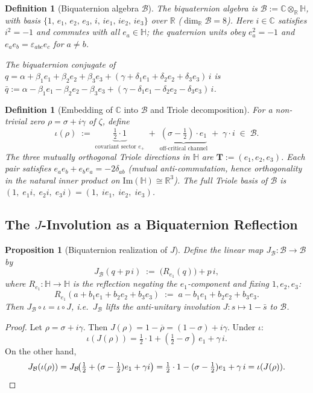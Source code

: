 \documentclass[12pt,a4paper]{article}
\newtheorem{proposition}[theorem]{Proposition}
\newtheorem{definition}[theorem]{Definition}
\theoremstyle{remark}
\begin{document}
\begin{definition}[Biquaternion algebra $\mathcal{B}$]\label{def:biquaternion}
The \emph{biquaternion algebra} is $\mathcal{B}:=\mathbb{C}\otimes_{\mathbb{R}}\mathbb{H}$,
with basis $\{1,\,e_1,\,e_2,\,e_3,\,i,\,ie_1,\,ie_2,\,ie_3\}$
over $\mathbb{R}$ ($\dim_{\mathbb{R}}\mathcal{B}=8$).
Here $i\in\mathbb{C}$ satisfies $i^2=-1$ and commutes with all
$e_a\in\mathbb{H}$; the quaternion units obey
$e_a^2=-1$ and $e_ae_b=\varepsilon_{abc}e_c$ for $a\neq b$.

The \emph{biquaternion conjugate} of
$q=\alpha+\beta_1e_1+\beta_2e_2+\beta_3e_3
   +(\gamma+\delta_1e_1+\delta_2e_2+\delta_3e_3)\,i$
is
$\bar{q}:=\alpha-\beta_1e_1-\beta_2e_2-\beta_3e_3
   +(\gamma-\delta_1e_1-\delta_2e_2-\delta_3e_3)\,i$.
\end{definition}

\begin{definition}[Embedding of $\mathbb{C}$ into $\mathcal{B}$
and Triole decomposition]\label{def:triole_embed}
For a non-trivial zero $\rho=\sigma+i\gamma$ of $\zeta$, define
\[
  \iota(\rho)
  \;:=\;
  \underbrace{\tfrac{1}{2}\cdot 1}_{\text{covariant sector }e_+}
  \;+\;
  \underbrace{(\sigma-\tfrac{1}{2})\cdot e_1}_{\text{off-critical channel}}
  \;+\;
  \gamma\cdot i
  \;\in\;\mathcal{B}.
\]
The three mutually orthogonal \emph{Triole} directions in $\mathbb{H}$
are $\mathbf{T}:=(e_1,e_2,e_3)$.
Each pair satisfies $e_ae_b+e_be_a=-2\delta_{ab}$ (mutual
anti-commutation, hence orthogonality in the natural inner product
on $\mathrm{Im}(\mathbb{H})\cong\mathbb{R}^3$).
The full \emph{Triole basis} of $\mathcal{B}$ is
$(1,\;e_1i,\;e_2i,\;e_3i) = (1,\;ie_1,\;ie_2,\;ie_3)$.
\end{definition}

\subsection*{The $J$-Involution as a Biquaternion Reflection}

\begin{proposition}[Biquaternion realization of $J$]
\label{prop:JB}
Define the linear map $J_{\mathcal{B}}:\mathcal{B}\to\mathcal{B}$ by
\[
  J_{\mathcal{B}}(q + p\,i)
  \;:=\;
  \bigl(R_{e_1}(q)\bigr) + p\,i,
\]
where $R_{e_1}:\mathbb{H}\to\mathbb{H}$ is the \emph{reflection}
negating the $e_1$-component and fixing $1,e_2,e_3$:
\[
  R_{e_1}(a + b_1e_1 + b_2e_2 + b_3e_3)
  \;:=\; a - b_1e_1 + b_2e_2 + b_3e_3.
\]
Then $J_{\mathcal{B}}\circ\iota = \iota\circ J$, i.e.\ $J_{\mathcal{B}}$
lifts the anti-unitary involution $J:s\mapsto1-\bar{s}$ to $\mathcal{B}$.
\end{proposition}
\begin{proof}
Let $\rho=\sigma+i\gamma$.
Then $J(\rho)=1-\overline{\rho}=(1-\sigma)+i\gamma$.
Under $\iota$:
\[
  \iota(J(\rho))
  = \tfrac{1}{2}\cdot 1 + (\tfrac{1}{2}-\sigma)\,e_1 + \gamma\,i.
\]
On the other hand, 
\[
  J_{\mathcal{B}}(\iota(\rho))
  = J_{\mathcal{B}}\!\bigl(\tfrac{1}{2} + (\sigma-\tfrac{1}{2})e_1 + \gamma i\bigr)
  = \tfrac{1}{2}\cdot 1 - (\sigma-\tfrac{1}{2})e_1 + \gamma\,i
  = \iota(J(\rho)).
\qedhere
\]
\end{proof}
\end{document}
